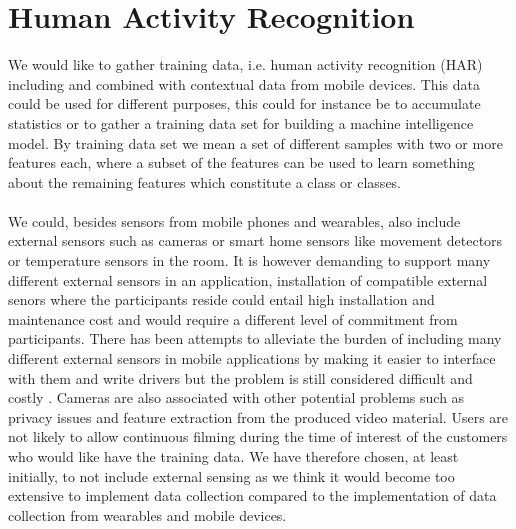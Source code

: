
\section{Human Activity Recognition}
\label{sec:human_activity_recognition}


We would like to gather training data, i.e. human activity recognition (HAR) including and combined with contextual data from mobile devices. This data could be used for different purposes, this could for instance be to accumulate statistics or to gather a training data set for building a machine intelligence model. By training data set we mean a set of different samples with two or more features each, where a subset of the features can be used to learn something about the remaining features which constitute a class or classes.
\\\\
We could, besides sensors from mobile phones and wearables, also include external sensors such as cameras or smart home sensors like movement detectors or temperature sensors in the room. It is however demanding to support many different external sensors in an application, installation of compatible external senors where the participants reside could entail high installation and maintenance cost and would require a different level of commitment from participants. There has been attempts to alleviate the burden of including many different external sensors in mobile applications by making it easier to interface with them and write drivers but the problem is still considered difficult and costly \parencite{open_data_kit}. Cameras are also associated with other potential problems such as privacy issues and feature extraction from the produced video material. Users are not likely to allow continuous filming during the time of interest of the customers who would like have the training data. We have therefore chosen, at least initially, to not include external sensing as we think it would become too extensive to implement data collection compared to the implementation of data collection from wearables and mobile devices.
\\\\
